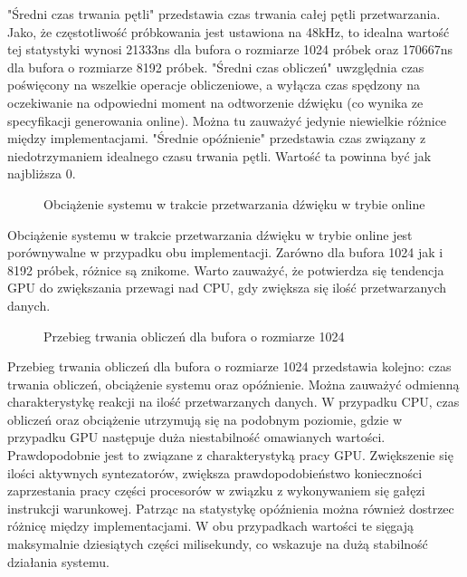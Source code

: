 "Średni czas trwania pętli" przedstawia czas trwania całej pętli przetwarzania. Jako, że częstotliwość próbkowania jest ustawiona na 48kHz, to idealna wartość tej statystyki wynosi 21333ns dla bufora o rozmiarze 1024 próbek oraz 170667ns dla bufora o rozmiarze 8192 próbek. "Średni czas obliczeń" uwzględnia czas poświęcony na wszelkie operacje obliczeniowe, a wyłącza czas spędzony na oczekiwanie na odpowiedni moment na odtworzenie dźwięku (co wynika ze specyfikacji generowania online). Można tu zauważyć jedynie niewielkie różnice między implementacjami. "Średnie opóźnienie" przedstawia czas związany z niedotrzymaniem idealnego czasu trwania pętli. Wartość ta powinna być jak najbliższa 0.

\begin{figure}[H]
    \centering
    \scalebox{1.0}{}
    \caption{Obciążenie systemu w trakcie przetwarzania dźwięku w trybie online}
    \label{fig:Obciążenie systemu w trakcie przetwarzania dźwięku w trybie online}
\end{figure}

Obciążenie systemu w trakcie przetwarzania dźwięku w trybie online jest porównywalne w przypadku obu implementacji. Zarówno dla bufora 1024 jak i 8192 próbek, różnice są znikome. Warto zauważyć, że potwierdza się tendencja GPU do zwiększania przewagi nad CPU, gdy zwiększa się ilość przetwarzanych danych.

\begin{figure}[H]
    \centering
    \scalebox{1.0}{}
    \caption{Przebieg trwania obliczeń dla bufora o rozmiarze 1024}
    \label{fig:Przebieg trwania obliczeń dla bufora o rozmiarze 1024}
\end{figure}

Przebieg trwania obliczeń dla bufora o rozmiarze 1024 przedstawia kolejno: czas trwania obliczeń, obciążenie systemu oraz opóźnienie. Można zauważyć odmienną charakterystykę reakcji na ilość przetwarzanych danych. W przypadku CPU, czas obliczeń oraz obciążenie utrzymują się na podobnym poziomie, gdzie w przypadku GPU następuje duża niestabilność omawianych wartości. Prawdopodobnie jest to związane z charakterystyką pracy GPU. Zwiększenie się ilości aktywnych syntezatorów, zwiększa prawdopodobieństwo konieczności zaprzestania pracy części procesorów w związku z wykonywaniem się gałęzi instrukcji warunkowej. Patrząc na statystykę opóźnienia można również dostrzec różnicę między implementacjami. W obu przypadkach wartości te sięgają maksymalnie dziesiątych części milisekundy, co wskazuje na dużą stabilność działania systemu.